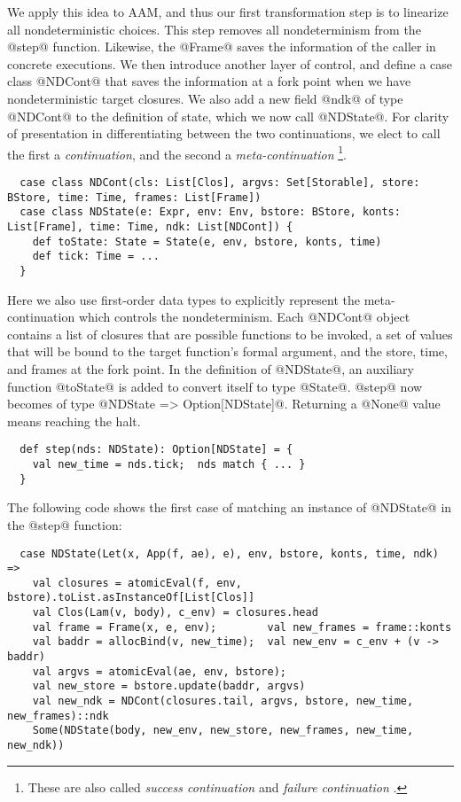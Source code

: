 \documentclass[acmsmall, screen]{acmart}\settopmatter{}
\begin{document}
We apply this idea to AAM, and thus our first transformation step is to linearize all
nondeterministic choices. This step removes all nondeterminism from the @step@ function.
Likewise, the @Frame@ saves the information of the caller in concrete executions.
We then introduce another layer of control, and define a case class @NDCont@
that saves the information at a fork point when we have nondeterministic target closures.
We also add a new field @ndk@ of type @NDCont@ to the definition of state, which we now
call @NDState@. For clarity of presentation in differentiating between the two continuations,
we elect to call the first a \emph{continuation}, and the second a \emph{meta-continuation}
\footnote{These are also called \emph{success continuation} and \emph{failure
continuation} \cite{Danvy:1990:AC:91556.91622}.}.

\begin{lstlisting}
  case class NDCont(cls: List[Clos], argvs: Set[Storable], store: BStore, time: Time, frames: List[Frame])
  case class NDState(e: Expr, env: Env, bstore: BStore, konts: List[Frame], time: Time, ndk: List[NDCont]) {
    def toState: State = State(e, env, bstore, konts, time)
    def tick: Time = ...
  }
\end{lstlisting}

Here we also use first-order data types to explicitly represent the meta-continuation which
controls the nondeterminism.
Each @NDCont@ object contains a list of closures that are possible functions to be invoked,
a set of values that will be bound to the target function's formal argument, and the store, time,
and frames at the fork point. In the definition of @NDState@, an auxiliary function @toState@
is added to convert itself to type @State@.
@step@ now becomes of type @NDState => Option[NDState]@. Returning a @None@ value means
reaching the halt.

\begin{lstlisting}
  def step(nds: NDState): Option[NDState] = {
    val new_time = nds.tick;  nds match { ... }
  }
\end{lstlisting}

The following code shows the first case of matching an instance of @NDState@ in
the @step@ function:

\begin{lstlisting}
  case NDState(Let(x, App(f, ae), e), env, bstore, konts, time, ndk) =>
    val closures = atomicEval(f, env, bstore).toList.asInstanceOf[List[Clos]]
    val Clos(Lam(v, body), c_env) = closures.head
    val frame = Frame(x, e, env);        val new_frames = frame::konts
    val baddr = allocBind(v, new_time);  val new_env = c_env + (v -> baddr)
    val argvs = atomicEval(ae, env, bstore);
    val new_store = bstore.update(baddr, argvs)
    val new_ndk = NDCont(closures.tail, argvs, bstore, new_time, new_frames)::ndk
    Some(NDState(body, new_env, new_store, new_frames, new_time, new_ndk))
\end{lstlisting}
\end{document}
